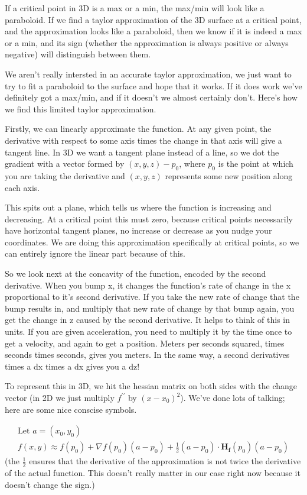 \documentclass[12pt, letterpaper]{article}
\begin{document}
If a critical point in 3D is a max or a min, the max/min will look like a paraboloid. If we find a taylor approximation of the 3D surface at a critical point, and the approximation looks like a paraboloid, then we know if it is indeed a max or a min, and its sign (whether the approximation is always positive or always negative) will distinguish between them.

We aren't really intersted in an accurate taylor approximation, we just want to try to fit a paraboloid to the surface and hope that it works. If it does work we've definitely got a max/min, and if it doesn't we almost certainly don't. Here's how we find this limited taylor approximation.

Firstly, we can linearly approximate the function. At any given point, the derivative with respect to some axis times the change in that axis will give a tangent line. In 3D we want a tangent plane instead of a line, so we dot the gradient with a vector formed by $(x, y, z) - p_0$, where $p_0$ is the point at which you are taking the derivative and $(x, y, z)$ represents some new position along each axis.

This spits out a plane, which tells us where the function is increasing and decreasing. At a critical point this must zero, because critical points necessarily have horizontal tangent planes, no increase or decrease as you nudge your coordinates.
We are doing this approximation specifically at critical points, so we can entirely ignore the linear part because of this.

So we look next at the concavity of the function, encoded by the second derivative. When you bump x, it changes the function's rate of change in the x proportional to it's second derivative.
If you take the new rate of change that the bump results in, and multiply that new rate of change by that bump again, you get the change in z caused by the second derivative.
It helps to think of this in units. If you are given acceleration, you need to multiply it by the time once to get a velocity, and again to get a position.
Meters per seconds squared, times seconds times seconds, gives you meters. In the same way, a second derivatives times a dx times a dx gives you a dz!

To represent this in 3D, we hit the hessian matrix on both sides with the change vector (in 2D we just multiply $f^{\prime \prime}$ by $(x - x_0)^2$). We've done lots of talking; here are some nice conscise symbols.

\begin{gather*}
    \text{Let } a = (x_0, y_0)\\
    f(x, y) \approx f(p_0) + \nabla f(p_0)(a - p_0) + \frac{1}{2}(a - p_0) \cdot \mathbf{H_f}(p_0)(a - p_0)
\end{gather*}
(the $\frac{1}{2}$ ensures that the derivative of the approximation is not twice the derivative of the actual function. 
This doesn't really matter in our case right now because it doesn't change the sign.)
\end{document}
